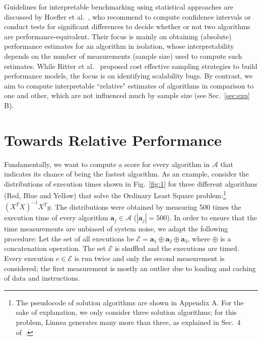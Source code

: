 \documentclass[conference]{IEEEtran}
\begin{document}
Guidelines for interpretable benchmarking using statistical approaches are discussed by Hoefler et
al.~\cite{hoefler2015scientific}, who recommend to compute confidence intervals or conduct tests for significant
differences to decide whether or not two
algorithms are performance-equivalent. Their focus is mainly on obtaining (absolute) performance estimates for an
algorithm in isolation, whose interpretability depends on the number of measurements (sample size) used to compute such
estimates. While Ritter et al.~\cite{ritter2020learning} proposed cost effective sampling strategies to build
performance models, the focus is on identifying scalability bugs. By contrast, we aim to compute interpretable
``relative" estimates of algorithms in comparison to one and other, which are not influenced much by sample size (see
Sec.~\ref{sec:exp} B).
 

\section{Towards Relative Performance}
\label{sec:torel}
Fundamentally, we want to compute a score for every algorithm in $\mathcal{A}$ that indicates its chance of being the fastest algorithm. As an example, consider the distributions of execution times shown in Fig.~\ref{fig:1} for three different algorithms (Red, Blue and
Yellow) that solve the Ordinary Least Square problem:\footnote{The pseudocode of solution algorithms are shown in Appendix A. For the sake of
  explanation, we only consider three solution algorithms; for this problem, Linnea generates many more than three,
  as explained in Sec.~4 of~\cite{barthels2019linnea}.} $(X^TX)^{-1}X^{T}y$. 
The distributions were obtained by measuring 500 times the execution time of every algorithm $\mathbf{a}_j \in \mathcal{A}$  ($|\mathbf{a}_j| = 500$).
In order to ensure that the time measurements are unbiased of system noise, we adapt the following procedure: Let the set of all executions be $\mathcal{E} = \mathbf{a}_1 \oplus \mathbf{a}_2 \oplus \mathbf{a}_3$, where $\oplus$
is a concatenation operation. The set $\mathcal{E}$ is shuffled and the executions are timed. Every execution $e \in
\mathcal{E}$ is run twice and only the second measurement is considered; the first measurement is mostly an outlier due
to loading and caching of data and instructions\cite{peise2019elaps}. 
\end{document}

